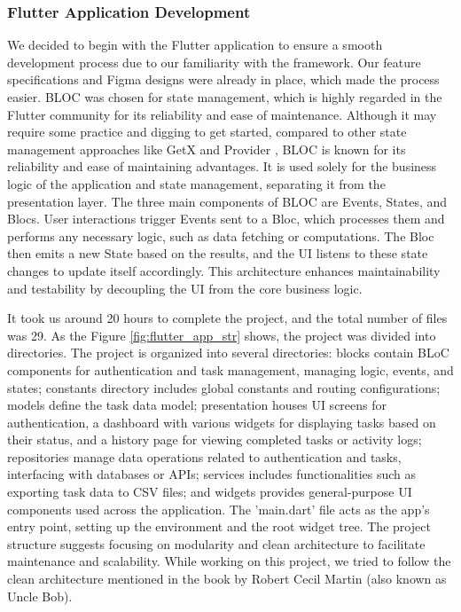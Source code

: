 \subsubsection{Flutter Application Development}
We decided to begin with the Flutter application to ensure a smooth development process due to our familiarity with the framework. Our feature specifications and Figma designs were already in place, which made the process easier. BLOC \cite{bloc} was chosen for state management, which is highly regarded in the Flutter community for its reliability and ease of maintenance. Although it may require some practice and digging to get started, compared to other state management approaches like GetX \cite{getX} and Provider \cite{provider}, BLOC is known for its reliability and ease of maintaining advantages. It is used solely for the business logic of the application and state management, separating it from the presentation layer. The three main components of BLOC are Events, States, and Blocs. User interactions trigger Events sent to a Bloc, which processes them and performs any necessary logic, such as data fetching or computations. The Bloc then emits a new State based on the results, and the UI listens to these state changes to update itself accordingly. This architecture enhances maintainability and testability by decoupling the UI from the core business logic.

\par
It took us around 20 hours to complete the project, and the total number of files was 29. As the Figure \ref*{fig:flutter_app_str} shows, the project was divided into directories. The project is organized into several directories: blocks contain BLoC components for authentication and task management, managing logic, events, and states; constants directory includes global constants and routing configurations; models define the task data model; presentation houses UI screens for authentication, a dashboard with various widgets for displaying tasks based on their status, and a history page for viewing completed tasks or activity logs; repositories manage data operations related to authentication and tasks, interfacing with databases or APIs; services includes functionalities such as exporting task data to CSV files; and widgets provides general-purpose UI components used across the application. The 'main.dart' file acts as the app's entry point, setting up the environment and the root widget tree. The project structure suggests focusing on modularity and clean architecture to facilitate maintenance and scalability. While working on this project, we tried to follow the clean architecture mentioned in the book \cite{martin2009clean} by Robert Cecil Martin (also known as Uncle Bob).
